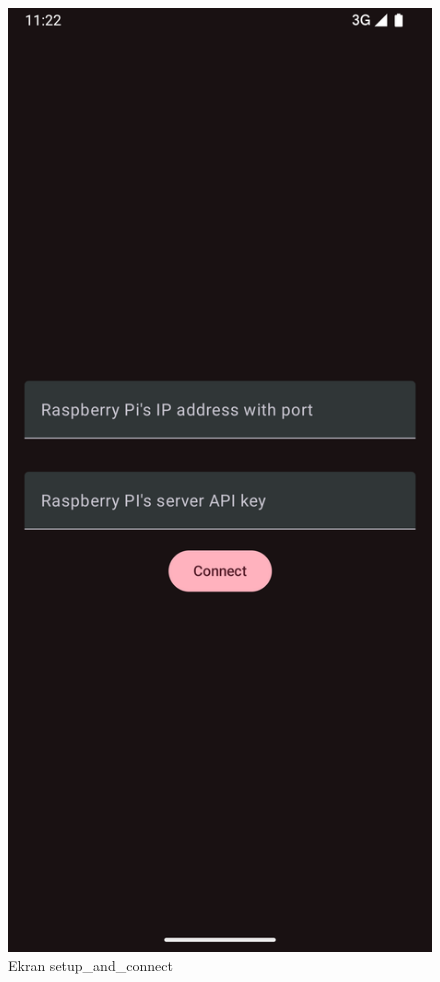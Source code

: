 \documentclass[12pt]{article}
\begin{document}
\begin{figure}[H]
    \centering
    \hypertarget{fig:setup-screen}{}
    \includegraphics[scale=0.2]{figures/setup_screen.png}
    \caption{Ekran setup\_and\_connect}
    \label{fig:błędne-dane-setup-screen}
\end{figure}
\end{document}
